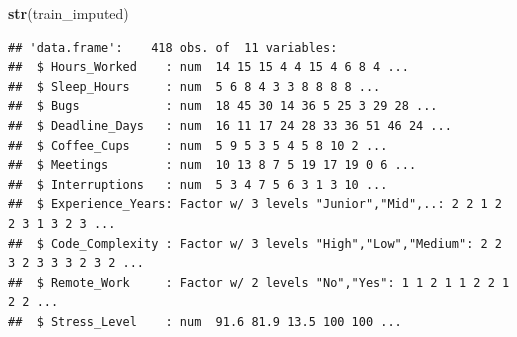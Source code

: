 \documentclass[
]{article}
\newenvironment{Shaded}{\begin{snugshade}}{\end{snugshade}}
\newcommand{\FunctionTok}[1]{\textcolor[rgb]{0.13,0.29,0.53}{\textbf{#1}}}
\newcommand{\NormalTok}[1]{#1}
\newcommand{\OtherTok}[1]{\textcolor[rgb]{0.56,0.35,0.01}{#1}}
\newcommand{\SpecialCharTok}[1]{\textcolor[rgb]{0.81,0.36,0.00}{\textbf{#1}}}
\begin{document}
\begin{Shaded}
\end{Shaded}

\begin{Shaded}
\begin{Highlighting}[]
\FunctionTok{str}\NormalTok{(train\_imputed)}
\end{Highlighting}
\end{Shaded}

\begin{verbatim}
## 'data.frame':    418 obs. of  11 variables:
##  $ Hours_Worked    : num  14 15 15 4 4 15 4 6 8 4 ...
##  $ Sleep_Hours     : num  5 6 8 4 3 3 8 8 8 8 ...
##  $ Bugs            : num  18 45 30 14 36 5 25 3 29 28 ...
##  $ Deadline_Days   : num  16 11 17 24 28 33 36 51 46 24 ...
##  $ Coffee_Cups     : num  5 9 5 3 5 4 5 8 10 2 ...
##  $ Meetings        : num  10 13 8 7 5 19 17 19 0 6 ...
##  $ Interruptions   : num  5 3 4 7 5 6 3 1 3 10 ...
##  $ Experience_Years: Factor w/ 3 levels "Junior","Mid",..: 2 2 1 2 2 3 1 3 2 3 ...
##  $ Code_Complexity : Factor w/ 3 levels "High","Low","Medium": 2 2 3 2 3 3 3 2 3 2 ...
##  $ Remote_Work     : Factor w/ 2 levels "No","Yes": 1 1 2 1 1 2 2 1 2 2 ...
##  $ Stress_Level    : num  91.6 81.9 13.5 100 100 ...
\end{verbatim}
\end{document}
